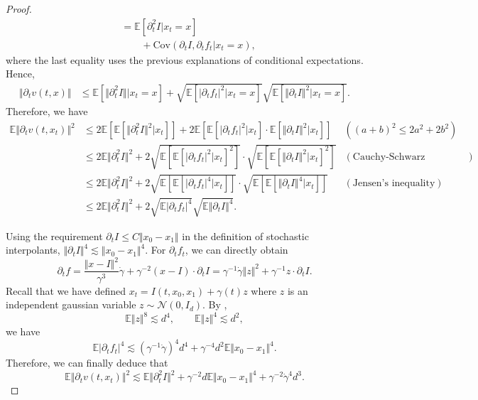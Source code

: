 \begin{proof}
$$\begin{aligned}
        &=\mathbb{E}[\partial_t^2I|x_t=x]\\
        &\qquad+\text{Cov}(\partial_tI,\partial_tf_t|x_t=x),
    \end{aligned}$$
    where the last equality uses the previous explanations of conditional expectations. Hence,
    $$\begin{aligned}
        \Vert\partial_tv(t,x)\Vert&\le\mathbb{E}[\Vert\partial_t^2I\Vert|x_t=x]+\sqrt{\mathbb{E}[|\partial_tf_t|^2|x_t=x]}\sqrt{\mathbb{E}[\Vert\partial_tI\Vert^2|x_t=x]}.
    \end{aligned}$$
    Therefore, we have 
    $$\begin{aligned}
        \mathbb{E}\Vert\partial_tv(t,x_t)\Vert^2&\le2\mathbb{E}[\mathbb{E}[\Vert\partial_t^2I\Vert^2|x_t]]+2\mathbb{E}[\mathbb{E}[|\partial_tf_t|^2|x_t]\cdot\mathbb{E}[\Vert\partial_tI\Vert^2|x_t]]&((a+b)^2\le2a^2+2b^2)\\
        &\le2\mathbb{E}\Vert\partial_t^2I\Vert^2+2\sqrt{\mathbb{E}[\mathbb{E}[|\partial_tf_t|^2|x_t]^2]}\cdot\sqrt{\mathbb{E}[\mathbb{E}[\Vert\partial_tI\Vert^2|x_t]^2]}&(\text{Cauchy-Schwarz inequality})\\
        &\le2\mathbb{E}\Vert\partial_t^2I\Vert^2+2\sqrt{\mathbb{E}[\mathbb{E}[|\partial_tf_t|^4|x_t]]}\cdot\sqrt{\mathbb{E}[\mathbb{E}[\Vert\partial_tI\Vert^4|x_t]]}&(\text{Jensen's inequality})\\
        &\le2\mathbb{E}\Vert\partial_t^2I\Vert^2+2\sqrt{\mathbb{E}|\partial_tf_t|^4}\sqrt{\mathbb{E}\Vert\partial_tI\Vert^4}.
    \end{aligned}$$

    Using the requirement $\partial_tI\le C\Vert x_0-x_1\Vert$ in the definition of stochastic interpolants, $\Vert\partial_tI\Vert^4\lesssim\Vert x_0-x_1\Vert^4$. For $\partial_tf_t$, we can directly obtain
    $$\partial_tf=\frac{\Vert x-I\Vert^2}{\gamma^3}\dot{\gamma}+\gamma^{-2}(x-I)\cdot\partial_tI=\gamma^{-1}\dot{\gamma}\Vert z\Vert^2+\gamma^{-1}z\cdot\partial_tI.$$
Recall that we have defined $x_t=I(t,x_0,x_1)+\gamma(t)z$ where $z$ is an independent gaussian variable $z\sim\mathcal{N}(0,I_d)$. By , $$\mathbb{E}\Vert z\Vert^8\lesssim d^4,\qquad\mathbb{E}\Vert z\Vert^4\lesssim d^2,$$
we have $$\mathbb{E}|\partial_tf_t|^4\lesssim(\gamma^{-1}\dot{\gamma})^4d^4+\gamma^{-4}d^2\mathbb{E}\Vert x_0-x_1\Vert^4.$$
Therefore, we can finally deduce that
    $$\mathbb{E}\Vert\partial_tv(t,x_t)\Vert^2\lesssim\mathbb{E}\Vert\partial_t^2I\Vert^2+\gamma^{-2}d\mathbb{E}\Vert x_0-x_1\Vert^4+\gamma^{-2}\dot{\gamma}^4d^3.$$
\end{proof}

